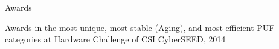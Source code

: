 \vspace{-0.3em}
\begin{cvsection}{Awards}
	\begin{cvsubsection}{}{}{}	
		Awards in the most unique, most stable (Aging), and most efficient PUF categories at Hardware Challenge of CSI CyberSEED, 2014
	\end{cvsubsection}
\end{cvsection}
\vspace{-0.3em}
